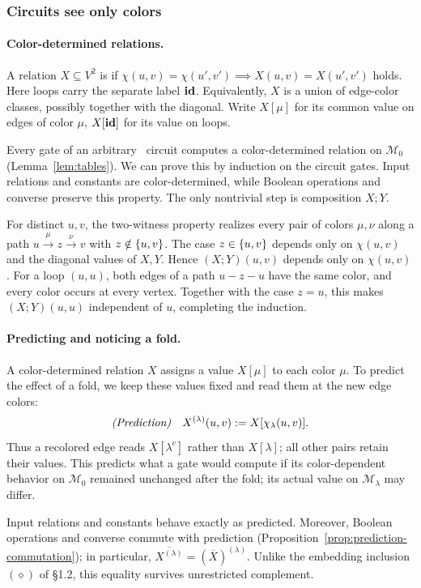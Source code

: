 \subsubsection{Circuits see only colors}\label{ov:types}

\paragraph{Color-determined relations.}
A relation $X\subseteq V^2$ is
 if
$\chi(u,v)=\chi(u',v') \implies X(u,v)=X(u',v')$ holds.
Here loops carry the separate label $\mathbf{id}$.
Equivalently, $X$ is a union of edge-color
classes, possibly together with the diagonal.
Write $X[\mu]$ for its common value on edges
of color $\mu$, $X[\mathbf{id}]$ for its value on
loops.

Every gate of an arbitrary \CoR\ circuit computes a color-determined relation on $\mathcal M_0$ (Lemma~\ref{lem:tables}).
We can prove this by induction on the
circuit gates. Input relations and constants are
color-determined, while Boolean operations and
converse preserve this property.
The only nontrivial step is composition $X;Y$.

For distinct $u,v$, the two-witness property realizes every pair of colors $\mu,\nu$ along a path $u\xrightarrow{\mu}z\xrightarrow{\nu}v$ with $z\notin\{ u,v \}$.
%
The case $z\in\{ u,v \}$ depends only on $\chi(u,v)$ and the diagonal values of $X,Y$.
Hence $(X;Y)(u,v)$ depends only on $\chi(u,v)$.
For a loop $(u,u)$, both edges of a path $u-z-u$ have the same color, and every color occurs at every vertex. 
Together with the case $z=u$, this makes $(X;Y)(u,u)$ independent of $u$, completing the induction.


\paragraph{Predicting and noticing a fold.}
A color-determined relation $X$ assigns a value $X[\mu]$ to each color $\mu$.
To predict the effect of a fold, we keep these values fixed and read them at the new edge colors:
\[
\emph{(Prediction)}\quad
X^{(\lambda)}(u,v):=X[\chi_\lambda(u,v)].
\]
Thus a recolored edge reads $X[\lambda^c]$ rather than $X[\lambda]$; all other pairs retain their values.
%
This predicts what a gate would compute if its color-dependent behavior on $\mathcal M_0$ remained unchanged after the fold;
its actual value on $\mathcal M_\lambda$ may differ.

Input relations and constants behave exactly as predicted.
Moreover, Boolean operations and converse commute with prediction
(Proposition~\ref{prop:prediction-commutation}); in particular,
$\overline{X^{(\lambda)}}=(\overline X)^{(\lambda)}$.
Unlike the embedding inclusion $(\diamond)$ of \S1.2,
this equality survives unrestricted complement.

